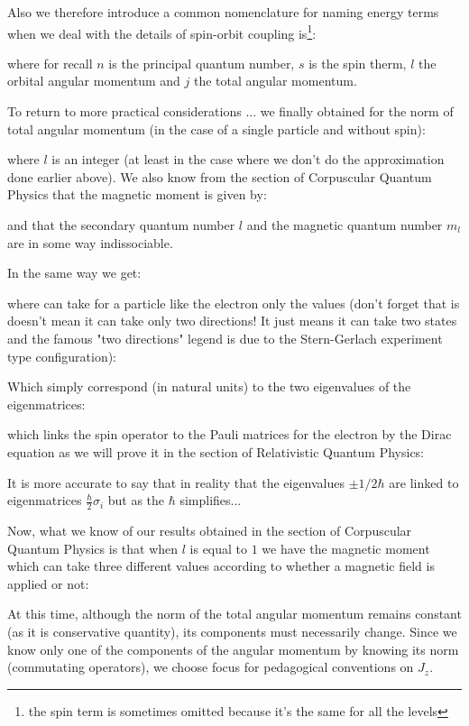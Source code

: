 	Also we therefore introduce a common nomenclature for naming energy terms when we deal with the details of spin-orbit coupling is\footnote{the spin term is sometimes omitted because it's the same for all the levels}:
	
	where for recall $n$ is the principal quantum number, $s$ is the spin therm, $l$ the orbital angular momentum and $j$ the total angular momentum.
	
	To return to more practical considerations ... we finally obtained for the norm of total angular momentum (in the case of a single particle and without spin):
	
	where $l$ is an integer (at least in the case where we don't do the approximation done earlier above). We also know from the section of Corpuscular Quantum Physics that the magnetic moment is given by:
	
	and that the secondary quantum number $l$ and the magnetic quantum number $m_l$ are in some way indissociable.

	In the same way we get:
	
	where can take for a particle like the electron only the values (don't forget that is doesn't mean it can take only two directions! It just means it can take two states and the famous "two directions" legend is due to the Stern-Gerlach experiment type configuration):
	
	Which simply correspond (in natural units) to the two eigenvalues of the eigenmatrices:
	
	which links the spin operator to the Pauli matrices for the electron  by the Dirac equation as we will prove it in the section of Relativistic Quantum Physics:
	
	\begin{tcolorbox}[title=Remark,colframe=black,arc=10pt]
	It is more accurate to say that in reality that the eigenvalues $\pm 1/2\hbar$ are linked to eigenmatrices $\frac{\hbar}{2}\sigma_i$ but as the $\hbar$ simplifies...
	\end{tcolorbox}
	Now, what we know of our results obtained in the section of Corpuscular Quantum Physics is that when $l$ is equal to $1$ we have the magnetic moment which can take three different values according to whether a magnetic field is applied or not:
	
	At this time, although the norm of the total angular momentum remains constant (as it is conservative quantity), its components must necessarily change. Since we know only one of the components of the angular momentum by knowing its norm (commutating operators), we choose focus for pedagogical conventions on $J_z$.
	
